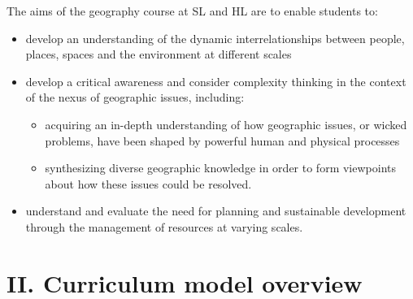 \documentclass[11pt,a4paper]{article}
\begin{document}
The aims of the geography course at SL and HL are to enable students to:
\begin{itemize}
    \item develop an understanding of the dynamic interrelationships between
    people, places, spaces and the environment at different scales
    \item develop a critical awareness and consider complexity thinking in the
    context of the nexus of geographic issues, including:
    \begin{itemize}[label=$\circ$,leftmargin=1.5em]
        \item acquiring an in-depth understanding of how geographic issues,
        or wicked problems, have been shaped by powerful human and
        physical processes
        \item synthesizing diverse geographic knowledge in order to form
        viewpoints about how these issues could be resolved.
    \end{itemize}
    \item understand and evaluate the need for planning and sustainable
    development through the management of resources at varying scales.
\end{itemize}

\section*{II. Curriculum model overview}
\end{document}
